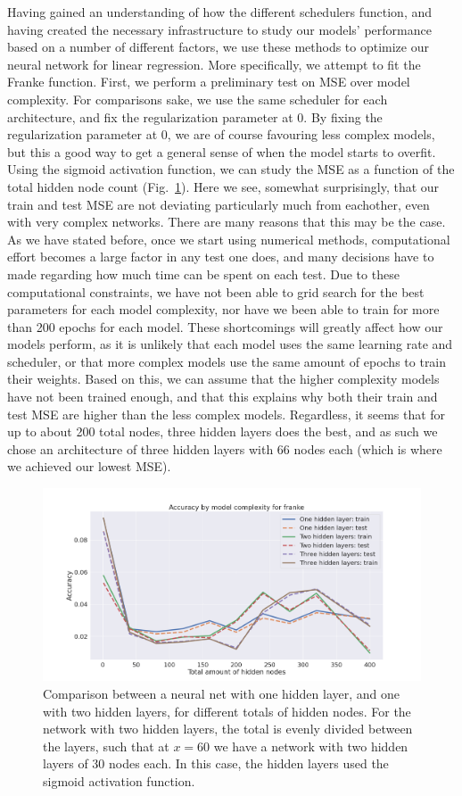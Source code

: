 \documentclass[onecolumn,10pt,cleanfoot]{asme2ej}
\begin{document}
Having gained an understanding of how the different schedulers function, and having created the necessary infrastructure to study our models' performance based on a number of different factors, we use these methods to optimize our neural network for linear regression. More specifically, we attempt to fit the Franke function. First, we perform a preliminary test on MSE over model complexity. For comparisons sake, we use the same scheduler for each architecture, and fix the regularization parameter at 0. By fixing the regularization parameter at 0, we are of course favouring less complex models, but this a good way to get a general sense of when the model starts to overfit. Using the sigmoid activation function, we can study the MSE as a function of the total hidden node count (Fig.~\ref{msebymodelfranke}). Here we see, somewhat surprisingly, that our train and test MSE are not deviating particularly much from eachother, even with very complex networks. There are many reasons that this may be the case. As we have stated before, once we start using numerical methods, computational effort becomes a large factor in any test one does, and many decisions have to made regarding how much time can be spent on each test. Due to these computational constraints, we have not been able to grid search for the best parameters for each model complexity, nor have we been able to train for more than 200 epochs for each model. These shortcomings will greatly affect how our models perform, as it is unlikely that each model uses the same learning rate and scheduler, or that more complex models use the same amount of epochs to train their weights. Based on this, we can assume that the higher complexity models have not been trained enough, and that this explains why both their train and test MSE are higher than the less complex models. Regardless, it seems that for up to about 200 total nodes, three hidden layers does the best, and as such we chose an architecture of three hidden layers with 66 nodes each (which is where we achieved our lowest MSE).

\begin{figure}[H]
\centerline{\includegraphics[width=6in]{figure/msebymodelfranke.png}}
\caption{Comparison between a neural net with one hidden layer, and one with two hidden layers, for different totals of hidden nodes. For the network with two hidden layers, the total is evenly divided between the layers, such that at $x = 60$ we have a network with two hidden layers of 30 nodes each. In this case, the hidden layers used the sigmoid activation function.}
\label{msebymodelfranke}
\end{figure}
\end{document}
